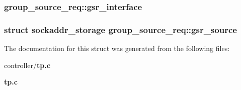 \subsubsection[{gsr\_\-interface}]{ {\bf group\_\-source\_\-req::gsr\_\-interface}}\label{structgroup__source__req_ac94ef4bad853488af9868ee95573fb41}
\subsubsection[{gsr\_\-source}]{\setlength{\rightskip}{0pt plus 5cm}struct {\bf sockaddr\_\-storage} {\bf group\_\-source\_\-req::gsr\_\-source}}\label{structgroup__source__req_a1511d15e97b3d6898151a24906a1c3d0}


The documentation for this struct was generated from the following files:\begin{DoxyCompactItemize}
\item 
controller/{\bf tp.c}\item 
{\bf tp.c}\end{DoxyCompactItemize}
